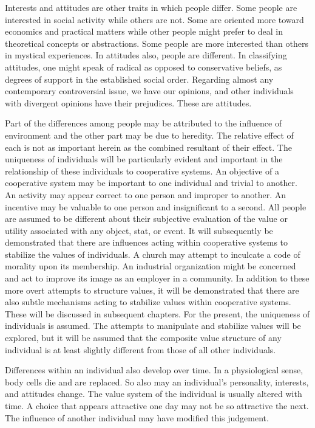 Interests and attitudes are other traits in which people differ. Some people are interested in social activity while others are not. Some are oriented more toward economics and practical matters while other people might prefer to deal in theoretical concepts or abstractions. Some people are more interested than others in mystical experiences. In attitudes also, people are different. In classifying attitudes, one might speak of radical as opposed to conservative beliefs, as degrees of support in the established social order. Regarding almost any contemporary controversial issue, we have our opinions, and other individuals with divergent opinions have their prejudices. These are attitudes.

Part of the differences among people may be attributed to the influence of environment and the other part may be due to heredity. The relative effect of each is not as important herein as the combined resultant of their effect. The uniqueness of individuals will be particularly evident and important in the relationship of these individuals to cooperative systems. An objective of a cooperative system may be important to one individual and trivial to another. An activity may appear correct to one person and improper to another. An incentive may be valuable to one person and insignificant to a second. All people are assumed to be different about their subjective evaluation of the value or utility associated with any object, stat, or event. It will subsequently be demonstrated that there are influences acting within cooperative systems to stabilize the values of individuals. A church may attempt to inculcate a code of morality upon its membership. An industrial organization might be concerned and act to improve its image as an employer in a community. In addition to these more overt attempts to structure values, it will be demonstrated that there are also subtle mechanisms acting to stabilize values within cooperative systems. These will be discussed in subsequent chapters. For the present, the uniqueness of individuals is assumed. The attempts to manipulate and stabilize values will be explored, but it will be assumed that the composite value structure of any individual is at least slightly different from those of all other individuals.

Differences within an individual also develop over time. In a physiological sense, body cells die and are replaced. So also may an individual’s personality, interests, and attitudes change. The value system of the individual is usually altered with time. A choice that appears attractive one day may not be so attractive the next. The influence of another individual may have modified this judgement.

